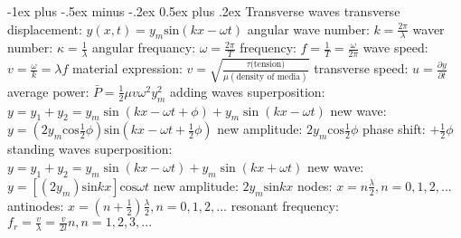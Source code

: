 \documentclass[10pt,landscape]{article}
\makeatletter
\renewcommand{\subsection}{\@startsection{subsection}{2}{0mm}%
                                {-1ex plus -.5ex minus -.2ex}%
                                {0.5ex plus .2ex}%
                                {\normalfont\normalsize\bfseries}}
\newcommand{\spc}{\hspace*{1em}}
\makeatother
\begin{document}
\begin{multicols}{3}
\subsection{Transverse waves}
transverse displacement: $y(x,t)=y_m\mathrm{sin}(kx-\omega t)$
\newline
\spc angular wave number: $k=\frac{2\pi }{\lambda }$
\newline
\spc waver number: $\kappa =\frac{1}{\lambda }$
\newline
\spc angular frequancy: $\omega =\frac{2 \pi}{T}$
\newline
\spc frequency: $f=\frac{1}{T}=\frac{\omega }{2 \pi}$
\newline
\spc wave speed: $v=\frac{\omega }{k}=\lambda f$
\newline
\spc \spc material expression: $v=\sqrt{\frac{\tau \textrm{(tension)}}{\mu (\textrm{density of media})}}$
\newline
\spc transverse speed: $u=\frac{\partial y}{\partial t}$
\newline
\spc average power: $\bar{P}=\frac{1}{2}\mu v\omega ^2y_m^2$
\newline \newline \newline \newline
adding waves
\newline
\spc superposition: $y=y_1+y_2=y_m\sin (kx-\omega t+\phi)+y_m\sin (kx-\omega t)$
\newline
\spc new wave: $y=(2y_m\mathrm{cos}\frac{1}{2}\phi)\mathrm{sin}(kx-\omega t+\frac{1}{2}\phi)$
\newline
\spc new amplitude: $2y_m\mathrm{cos}\frac{1}{2}\phi$
\newline
\spc phase shift: $+\frac{1}{2}\phi$
\newline
\newline
standing waves
\newline
\spc superposition: $y=y_1+y_2=y_m \sin (kx-\omega t)+y_m \sin (kx+\omega t)$
\newline
\spc new wave: $y=[(2y_m)\mathrm{sin}kx]\mathrm{cos}\omega t$
\newline
\spc new amplitude: $2y_m\mathrm{sin}kx$
\newline
\spc nodes: $x=n\frac{\lambda }{2}, n=0,1,2,...$
\newline
\spc antinodes: $x=(n+\frac{1}{2})\frac{\lambda }{2}, n=0,1,2,...$
\newline
\spc resonant frequency: $f_r=\frac{v}{\lambda }=\frac{v}{2l}n, n=1,2,3,...$


\end{multicols}
\end{document}
